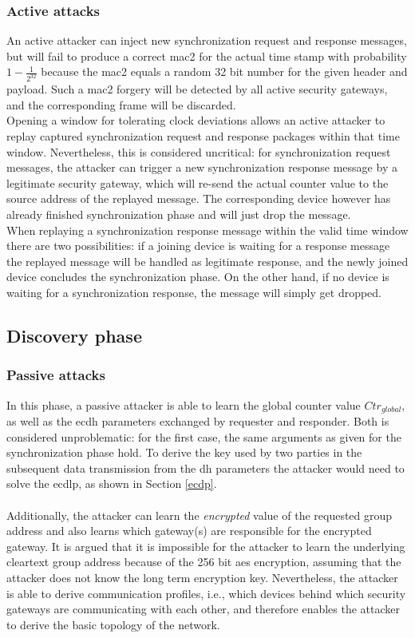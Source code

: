 \subsubsection{Active attacks}
An active attacker can inject new synchronization request and response messages, but will fail to produce a correct \gls{mac2} for the actual time stamp with probability
$1-\frac{1}{2^{32}}$ because
the \gls{mac2} equals a random 32 bit number for the given header and payload. Such a \gls{mac2} forgery will be detected by all active security gateways,
and the corresponding frame will be discarded. 
\\
Opening a window for tolerating clock deviations allows an active attacker to replay captured synchronization request and response packages within that time window.
Nevertheless, this is considered uncritical: for synchronization request messages, the attacker can trigger a new synchronization response message by a legitimate security gateway, which
will re-send the actual counter value to the source address of the replayed message. The corresponding device however has already finished synchronization phase and will just drop
the message.
\\
When replaying a synchronization response message within the valid time window there are two possibilities: if a joining device is waiting for a response message the replayed message
will be handled as legitimate response, and the newly joined device concludes the synchronization phase. On the other hand, if no device is waiting for a synchronization response,
the message will simply get dropped.

\subsection{Discovery phase}
\subsubsection{Passive attacks}
In this phase, a passive attacker is able to learn the global counter value $Ctr_{global}$, as well as the \gls{ecdh} parameters exchanged by requester and responder.
Both is considered unproblematic: for the first case, the same arguments as given for the synchronization phase hold. To derive the key used by two parties in the subsequent
data transmission from the \gls{dh} parameters the attacker would need to solve the \gls{ecdlp}, as shown in Section \ref{ecdp}.
\\
\\
Additionally, the attacker can learn 
the \textit{encrypted} value of the requested group address and also learns which gateway(s) are responsible for the encrypted gateway. It is argued that it is impossible for the
attacker to learn the underlying cleartext group address because of the 256 bit \gls{aes} encryption, assuming that the attacker does not know the long term encryption key.
Nevertheless, the attacker is able to derive communication profiles, i.e.,
which devices behind which security gateways are communicating with each other, and therefore enables the attacker to derive the basic topology of the network.

